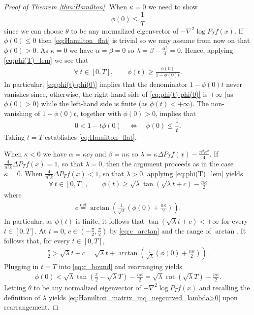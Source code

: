 \documentclass[a4paper,twoside,11pt,reqno]{amsart}
\newcommand{\eqdef}{\stackrel{\mathrm{def}}{=}}
\begin{document}
\begin{proof}[Proof of Theorem \ref{thm:Hamilton}]
When $\kappa=0$ we need to show 
\begin{equation}\label{eq:Hamilton_flat}
\phi(0)\le \frac{1}{T}
\end{equation}
since we can choose $\theta$ to be any normalized eigenvector of $-\nabla^2\log P_Tf(x)$. If $\phi(0)\le 0$ then \eqref{eq:Hamilton_flat} is trivial so we may assume from now on that $\phi(0)>0$. As $\kappa=0$ we have $\alpha=\beta=0$ so $\lambda=\beta-\frac{\alpha^2}{4}=0$. Hence,  applying \eqref{eq:phi(T)_lem} we see that
\begin{align}
\label{eq:phi(t)-phi(0)}
\forall \ t\in[0,T],\qquad \phi(t)\ge \frac{\phi(0)}{1-\phi(0)t}.
\end{align}
In particular, \eqref{eq:phi(t)-phi(0)} implies that the denominator $1-\phi(0)t$ never vanishes since, otherwise, the right-hand side of \eqref{eq:phi(t)-phi(0)} is $+\infty$ (as $\phi(0)>0$) while the left-hand side is finite (as $\phi(t)<+\infty$). The non-vanishing of $1-\phi(0)t$, together with $\phi(0)>0$, implies that  
\begin{equation}\label{eq:phi(t)inq1}
0<1-t\phi(0)\quad \Longleftrightarrow \quad \phi(0)\le \frac{1}{t}.
\end{equation}
Taking $t=T$ establishes \eqref{eq:Hamilton_flat}.


When $\kappa<0$ we have $\alpha=\kappa c_T$ and $\beta=n\kappa$ so $\lambda=\kappa \Delta P_Tf(x)-\frac{n^2\kappa^2}{4}$. If $\frac{4}{n^2k}\Delta P_Tf(x)=1$, so that $\lambda=0$, then the argument proceeds as in the case $\kappa=0$. When $\frac{4}{n^2k}\Delta P_Tf(x)<1$, so that $\lambda>0$, applying \eqref{eq:phi(T)_lem} yields
\begin{align}\label{eq:phi(T)_neg}
\forall \ t\in[0,T],\qquad \phi(t)\ge \sqrt{\lambda}\tan(\sqrt{\lambda}t+c) -\frac{n\kappa}{2}
\end{align}
where
\begin{align}\label{eq:c_arctan}
c\eqdef\arctan\left(\frac{1}{\sqrt{\lambda}}\left(\phi(0)+\frac{n\kappa}{2}\right)\right).
\end{align}
In particular, as $\phi(t)$ is finite, it follows that $\tan(\sqrt{\lambda}t+c) <+\infty$ for every $t\in [0,T]$. At $t=0$, $c\in \left(-\frac{\pi}{2},\frac{\pi}{2}\right)$ by \eqref{eq:c_arctan} and the range of $\arctan$. It follows that, for every $t\in [0,T]$,
\begin{align}
\label{eq:c_bound}
\frac{\pi}{2}>\sqrt{\lambda}t+c=\sqrt{\lambda}t+\arctan\left(\frac{1}{\sqrt{\lambda}}\left(\phi(0)+\frac{n\kappa}{2}\right)\right).
\end{align}
Plugging in $t=T$ into \eqref{eq:c_bound}  and rearranging yields
\begin{align}
\label{eq:phi(0)_bound}
\phi(0)<\sqrt{\lambda}\tan\left(\frac{\pi}{2}-\sqrt{\lambda}T\right)-\frac{n\kappa}{2}=\sqrt{\lambda}\cot\left(\sqrt{\lambda}T\right)-\frac{n\kappa}{2}.
\end{align}
Letting $\theta$ to be any normalized eigenvector of $-\nabla^2\log P_Tf(x)$ and recalling the definition of $\lambda$ yields \eqref{eq:Hamilton_matrix_inq_negcurved_lambda>0} upon rearrangement.
\end{proof}
\end{document}
